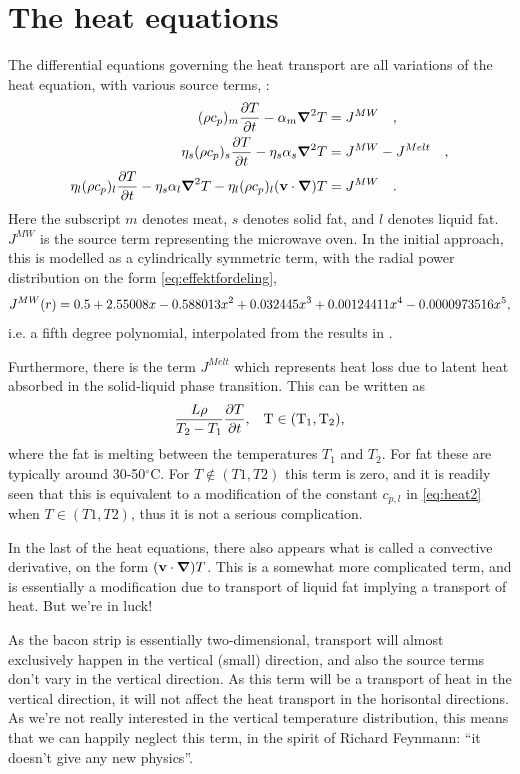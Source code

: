 \section{The heat equations}
The differential equations governing the heat transport are all variations of the heat
equation, with various source terms, :
\begin{align}
  \label{eq:heat1}
  (\rho c_p)_m \frac{\partial T}{\partial t} - \alpha_m \mbox{\boldmath$ \nabla $} ^2 T &= J^{MW} \quad \rm{,} \\
  \label{eq:heat2}
  \eta_s (\rho c_p)_s \frac{\partial T}{\partial t} - \eta_s\alpha_s \mbox{\boldmath$ \nabla $} ^2 T &= J^{MW} - J^{Melt}  \quad \rm{,} \\
  \label{eq:heat3}
  \eta_l (\rho c_p)_l \frac{\partial T}{\partial t} - \eta_s\alpha_l \mbox{\boldmath$ \nabla $} ^2 T - \eta_l(\rho c_p)_l(\mathbf{v}\cdot
  \mbox{\boldmath$ \nabla $})T &= J^{MW}  \quad \rm{.}
\end{align}
Here the subscript $m$ denotes meat, $s$ denotes solid fat, and $l$ denotes
liquid fat. $J^{MW}$ is the source term representing the microwave oven.
In the initial approach, this is modelled as a cylindrically symmetric term,
with the radial power distribution on the form \cref{eq:effektfordeling},
\begin{equation}
  J^{MW}(r) = 0.5 + 2.55008x - 0.588013x^2 + 0.032445x^3 + 0.00124411x^4 - 0.0000973516x^5 \rm{,}
  \label{eq:effektfordeling}
\end{equation}
i.e. a fifth degree polynomial, interpolated from the results in \cite{huang+zhu}.

Furthermore, there is the term $J^{Melt}$ which represents heat loss due to
latent heat absorbed in the solid-liquid phase transition. This can be written as 
\[ \frac{L \rho}{T_2-T_1} \frac{\partial T}{\partial t} \rm{,} \quad T \in (T_1,T_2) \rm{,}\]
where the fat is melting between the temperatures $T_1$ and $T_2$. For fat these
are typically around 30-50$^\circ$C. For $T \notin (T1,T2)$ this term is zero,
and it is readily seen that this is equivalent to a modification of the constant
$c_{p,l}$ in \cref{eq:heat2} when $T \in (T1,T2)$, thus it is not a serious
complication.

In the last of the heat equations, there also appears what is called a
convective derivative, on the form $(\mathbf{v}\cdot \mbox{\boldmath$ \nabla $})T$. This is a somewhat
more complicated term, and is essentially a modification due to transport of
liquid fat implying a transport of heat. But we're in luck! 

As the bacon strip is essentially two-dimensional, transport will almost
exclusively happen in the vertical (small) direction, and also the
source terms don't vary in the vertical direction. As this term will be a transport
of heat in the vertical direction, it will not affect the heat transport in
the horisontal directions.  As we're not really
interested in the vertical temperature distribution, this means that we can
happily neglect this term, in the spirit of Richard Feynmann: ``it doesn't give
any new physics''.

